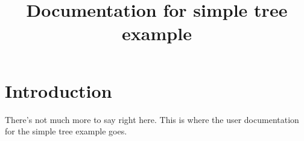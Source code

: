 \documentclass{article}
\begin{document}
\title{Documentation for simple tree example}
\maketitle

\section{Introduction}

There's not much more to say right here.
This is where the user documentation for the simple tree example goes.
\end{document}
